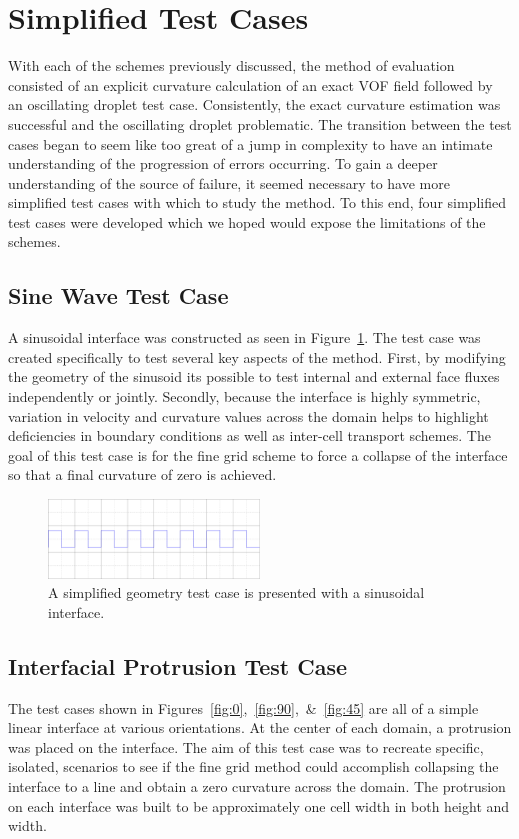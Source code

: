 \section{Simplified Test Cases}
With each of the schemes previously discussed, the method of evaluation consisted of an explicit curvature calculation of an exact VOF field followed by an oscillating droplet test case. Consistently, the exact curvature estimation was successful and the oscillating droplet problematic. The transition between the test cases began to seem like too great of a jump in complexity to have an intimate understanding of the progression of errors occurring. To gain a deeper understanding of the source of failure, it seemed necessary to have more simplified test cases with which to study the method. To this end, four simplified test cases were developed which we hoped would expose the limitations of the schemes.

\subsection{Sine Wave Test Case}
A sinusoidal interface was constructed as seen in Figure~\ref{fig:sine}. The test case was created specifically to test several key aspects of the method. First, by modifying the geometry of the sinusoid its possible to test internal and external face fluxes independently or jointly. Secondly, because the interface is highly symmetric, variation in velocity and curvature values across the domain helps to highlight deficiencies in boundary conditions as well as inter-cell transport schemes. The goal of this test case is for the fine grid scheme to force a collapse of the interface so that a final curvature of zero is achieved.  
\begin{figure}[htbp]
	\centering
	\includegraphics[width=0.5\textwidth]{figs/sine}
	\caption{A simplified geometry test case is presented with a sinusoidal interface.}
	\label{fig:sine}
\end{figure}

\subsection{Interfacial Protrusion Test Case}
The test cases shown in Figures~\ref{fig:0},~\ref{fig:90},~\&~\ref{fig:45} are all of a simple linear interface at various orientations. At the center of each domain, a protrusion was placed on the interface. The aim of this test case was to recreate specific, isolated, scenarios to see if the fine grid method could accomplish collapsing the interface to a line and obtain a zero curvature across the domain. The protrusion on each interface was built to be approximately one cell width in both height and width.  

